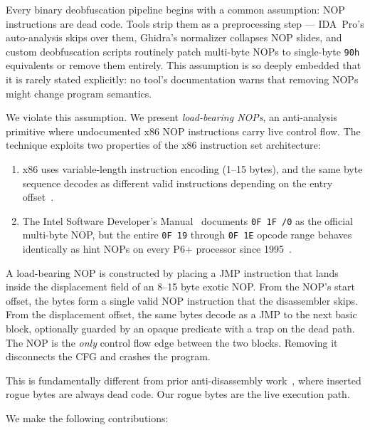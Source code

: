\documentclass[letterpaper,twocolumn,10pt]{article}
\begin{document}
Every binary deobfuscation pipeline begins with a common assumption: NOP instructions are dead code. Tools strip them as a preprocessing step --- IDA~Pro's auto-analysis skips over them, Ghidra's normalizer collapses NOP slides, and custom deobfuscation scripts routinely patch multi-byte NOPs to single-byte \texttt{90h} equivalents or remove them entirely. This assumption is so deeply embedded that it is rarely stated explicitly: no tool's documentation warns that removing NOPs might change program semantics.

We violate this assumption. We present \emph{load-bearing NOPs}, an anti-analysis primitive where undocumented x86 NOP instructions carry live control flow. The technique exploits two properties of the x86 instruction set architecture:

\begin{enumerate}
\item x86 uses variable-length instruction encoding (1--15 bytes), and the same byte sequence decodes as different valid instructions depending on the entry offset~\cite{linn03}.
\item The Intel Software Developer's Manual~\cite{intelsdm} documents \texttt{0F~1F~/0} as the official multi-byte NOP, but the entire \texttt{0F~19} through \texttt{0F~1E} opcode range behaves identically as hint NOPs on every P6+ processor since 1995~\cite{sandpile}.
\end{enumerate}

A load-bearing NOP is constructed by placing a JMP instruction that lands inside the displacement field of an 8--15 byte exotic NOP. From the NOP's start offset, the bytes form a single valid NOP instruction that the disassembler skips. From the displacement offset, the same bytes decode as a JMP to the next basic block, optionally guarded by an opaque predicate with a trap on the dead path. The NOP is the \emph{only} control flow edge between the two blocks. Removing it disconnects the CFG and crashes the program.

This is fundamentally different from prior anti-disassembly work~\cite{linn03}, where inserted rogue bytes are always dead code. Our rogue bytes are the live execution path.

We make the following contributions:
\end{document}
